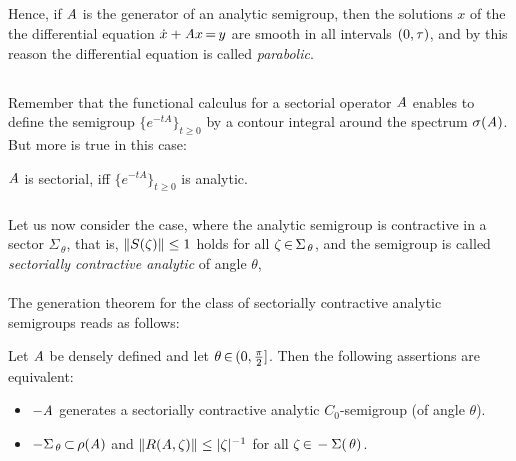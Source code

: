 \documentclass[11pt,twoside]{article}
\begin{document}
\subparagraph{} %
Hence,
if $\mathit{A}$ is the generator of an analytic semigroup,
then the solutions $x$ of the the differential equation
$\dot{x} + \mathit{A} x {\,=\,} y$ are smooth in all intervals $(0,\tau)$,
and by this reason the differential equation is called \textit{parabolic}.

\subsection{} %
Remember that the functional calculus for a sectorial operator $\mathit{A}$
enables to define the semigroup $\{e^{-tA}\}_{t \geq 0}$
by a contour integral around the spectrum $\sigma(\mathit{A})$.
But more is true in this case:

\begin{theorem}\label{SEMIGROUP_CREATED_BY_SECTORIAL_OPERATOR_IS_ANALYTIC}
$\mathit{A}$ is sectorial,
iff $\{e^{-tA}\}_{t \geq 0}$ is {analytic}.
\end{theorem}

\subparagraph{} %
Let us now consider the case,
where the analytic semigroup {\SG} is contractive
in a sector $\Sigma_{\,\theta}$,
that is,
$\left\lVert {S}(\zeta) \right\rVert \leq 1$ holds for all $\zeta {\,\in\,} \Sigma_{\,\theta}$,
and the semigroup is called \textit{sectorially contractive analytic}
of angle $\theta$,

\paragraph{}
The generation theorem for the class of sectorially contractive 
analytic semigroups reads as follows:

\begin{theorem}\label{CRITERION_FOR_SEMIGROUP_TO_BE_SECTORIALLY_CONTRACTIVE}
Let $\mathit{A}$ be densely defined and let $\theta {\,\in\,} (0,\frac{\pi}{2}]$.
Then the following assertions are equivalent:

\begin{itemize}[leftmargin=9mm]
\item[(a)]
${-}\mathit{A}$ generates a sectorially contractive analytic $C_0$-semigroup
(of angle $\theta$).

\item[(b)]
$-\Sigma_{\,\theta} {\,\subset\,} \rho(\mathit{A})$
and $\norm{R(\linA,\zeta)} \leq \abs{\zeta} ^{-1}$
for all $\zeta {\,\in\,} -\Sigma(\,\theta)$.
\end{itemize}
\end{theorem}
\end{document}
